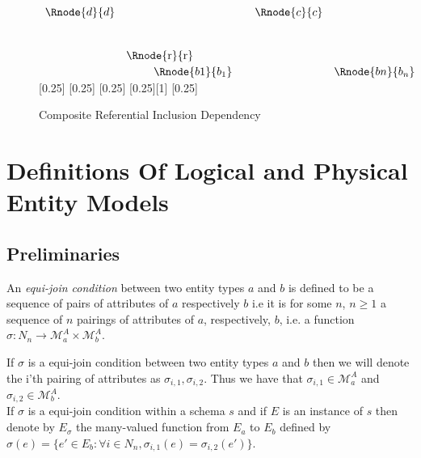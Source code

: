 \documentclass[10pt,a4paper]{article}
\newcommand{\term}[1]{\textit{{#1}}}
\newcommand{\genericmodel}{\mathcal{M}}
\newcommand{\allAttrs}{\genericmodel^A}
\newcommand{\attrs}[1]{\allAttrs_{#1}}
\begin{document}
\begin{figure} [H]
\begin{center}
$
\begin{array}{cp{0.5cm}c c c }
   \Rnode{d}{d} &                  &                       & \Rnode{c}{c}  &       \\[.5cm]  
		            & \ \ \ \Rnode{r}{r} &                     &               &       \\[.5cm] 
	              &                  & \Rnode{b1}{b_1} \ \ \ &               &  \Rnode{bn}{b_n}  
\end{array}
$
[0.25]
[0.25]
[0.25]
[0.25][1]
\idcomp
[0.25]
\idcomp
\end{center}
\caption{Composite Referential Inclusion Dependency}
\label{compositereferentialinclusiongraph}
\end{figure}



\section{Definitions Of Logical and Physical Entity Models}
\subsection{Preliminaries}
\begin{definition}
\noindent An \term{equi-join condition} between two entity types $a$ and $b$ is defined to be a sequence of pairs of attributes of 
 $a$ respectively $b$ i.e it is for some $n$, $n \geq 1$ a sequence of $n$ pairings of attributes of $a$, respectively, $b$, i.e. a function $\sigma: N_n \rightarrow \attrs{a} \times \attrs{b}$. \\
\end{definition}

\noindent If $\sigma$ is a equi-join condition between two entity types $a$ and $b$ then we will denote the i'th pairing of attributes as $\sigma_{i,1},\sigma_{i,2}$. 
Thus we have that  $\sigma_{i,1} \in \attrs{a}$ and $\sigma_{i,2} \in \attrs{b}$. \\

\noindent If $\sigma$ is a equi-join condition within a schema $s$ and if $E$ is an instance of $s$ then denote by $E_\sigma$
the many-valued function from $E_a$ to $E_b$
defined by $\sigma(e) = \{ e' \in E_b : \forall i \in N_n, \sigma_{i,1}(e)=\sigma_{i,2}(e') \}$. \\
\end{document}
